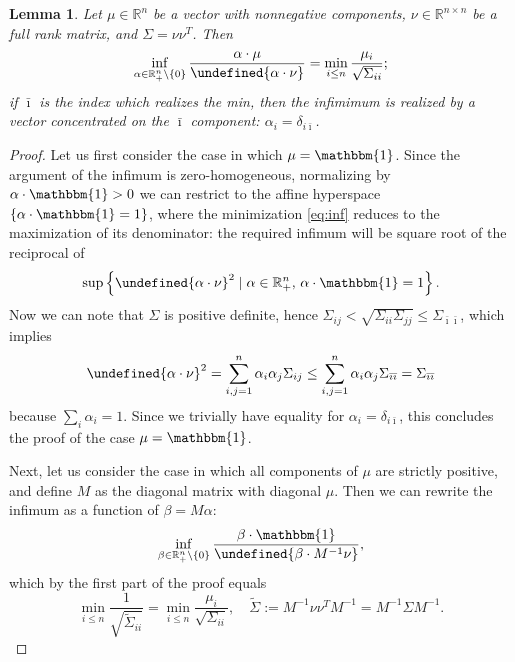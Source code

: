 \documentclass[11pt]{article}
\newtheorem{lemma}[theorem]{Lemma}
\let\norm\undefined %
\DeclarePairedDelimiter\norm{\lVert}{\rVert}
\begin{document}
\begin{lemma}
	Let $\mu \in \mathbb{R}^n$ be a vector with nonnegative components, $\nu \in \mathbb{R}^{n\times n}$ be a full rank matrix, and $\Sigma = \nu \nu^{T}$. Then
	\begin{equation}\label{eq:inf}
		\inf_{\alpha \in \mathbb{R}_{+}^n \setminus \{0\}} \frac{\alpha \cdot \mu}{\norm{\alpha \cdot \nu}} = \min_{i\leq n} \frac{\mu_i}{\sqrt{\Sigma_{ii}}};
	\end{equation}
	if $\bar{\imath}$ is the index which realizes the min, then the infimimum is realized by a vector concentrated on the $\bar{\imath}$ component: $\alpha_i = \delta_{i\bar{\imath}}$. 
\end{lemma}
\begin{proof}
	Let us first consider the case in which $\mu = \mathbbm{1}$. Since the argument of the infimum is zero-homogeneous, normalizing by $\alpha \cdot \mathbbm{1} > 0$ we can restrict to the affine hyperspace $\{\alpha \cdot \mathbbm{1} = 1\}$, where the minimization \eqref{eq:inf} reduces to the maximization of its denominator: the required infimum will be square root of the reciprocal of
	\[
	\sup\left\{\norm{\alpha \cdot \nu}^2 \mid \alpha \in \mathbb{R}_{+}^n,\, \alpha \cdot \mathbbm{1} = 1\right\}.
	\]
	Now we can note that $\Sigma$ is positive definite, hence $\Sigma_{ij} < \sqrt{\Sigma_{ii}\Sigma_{jj}} \leq \Sigma_{\bar{\imath}\bar{\imath}}$, which implies
	\[
	\norm{\alpha \cdot \nu}^2 = \sum_{i,j=1}^{n} \alpha_i \alpha_j \Sigma_{ij} \leq \sum_{i,j=1}^{n} \alpha_i \alpha_j \Sigma_{\bar{\imath}\bar{\imath}} = \Sigma_{\bar{\imath}\bar{\imath}}
	\]
	because $\sum_i \alpha_i = 1$. Since we trivially have equality for $\alpha_i = \delta_{i\bar{\imath}}$, this concludes the proof of the case $\mu = \mathbbm{1}$.
	
	Next, let us consider the case in which all components of $\mu$ are strictly positive, and define $M$ as the diagonal matrix with diagonal $\mu$. Then we can rewrite the infimum as a function of $\beta = M\alpha$:
	\[
	\inf_{\beta \in \mathbb{R}_{+}^n \setminus \{0\}} \frac{\beta \cdot \mathbbm{1}}{\norm{\beta \cdot M^{-1}\nu}},
	\]
	which by the first part of the proof equals 
	\[
	\min_{i \leq n} \frac{1}{\sqrt{\tilde{\Sigma}_{ii}}} = \min_{i \leq n} \frac{\mu_i}{\sqrt{\Sigma_{ii}}}, \quad \tilde{\Sigma} := M^{-1}\nu\nu^{T} M^{-1} = M^{-1}\Sigma M^{-1}.
	\]
	

\end{proof}
\end{document}
